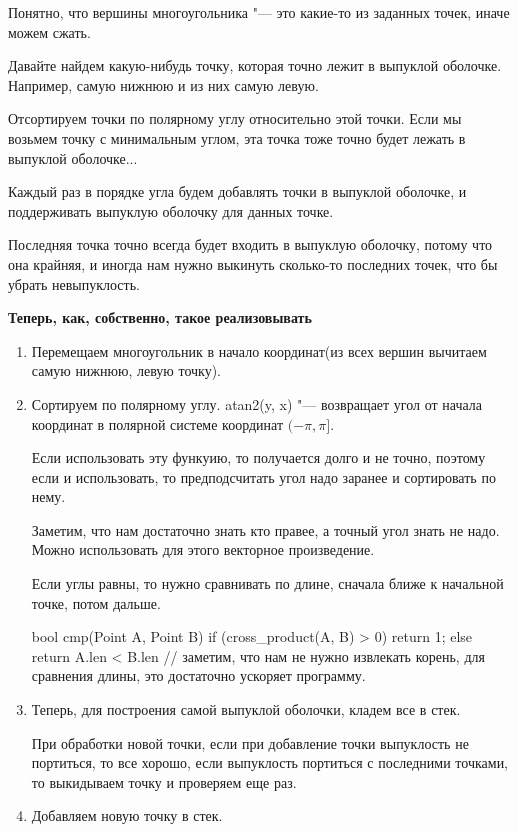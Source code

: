 Понятно, что вершины многоугольника "--- это какие-то из заданных точек, иначе можем сжать. 

Давайте найдем какую-нибудь точку, которая точно лежит в выпуклой оболочке. Например, самую нижнюю
и из них самую левую.

Отсортируем точки по полярному углу относительно этой точки. Если мы возьмем точку с минимальным углом, эта точка 
тоже точно будет лежать в выпуклой оболочке... 

Каждый раз в порядке угла будем добавлять точки в выпуклой оболочке, и поддерживать выпуклую оболочку для данных точке. 

Последняя точка точно всегда будет входить в выпуклую оболочку, потому что она крайняя, и иногда нам нужно выкинуть сколько-то
последних точек, что бы убрать невыпуклость.

\textbf{Теперь, как, собственно, такое реализовывать}

\begin{enumerate}
\item Перемещаем многоугольник в начало координат(из всех вершин вычитаем самую нижнюю, левую точку).

\item Сортируем по полярному углу.
atan2(y, x) "--- возвращает угол от начала координат в полярной системе координат $(-\pi, \pi]$.

Если использовать эту функуию, то получается долго и не точно, поэтому если и использовать, то предподсчитать угол надо
заранее и сортировать по нему.

Заметим, что нам достаточно знать кто правее,  а точный угол знать не надо. Можно использовать для этого векторное произведение.

Если углы равны, то нужно сравнивать по длине, сначала ближе к начальной точке, потом дальше.
\begin{cppcode}
bool cmp(Point A, Point B) {
    if (cross_product(A, B) > 0) return 1;
    else return A.len < B.len // заметим, что нам не нужно извлекать корень, для сравнения длины, это достаточно ускоряет программу. 
}
\end{cppcode}

\item
Теперь, для построения самой выпуклой оболочки, кладем все в стек.

При обработки новой точки, если при добавление точки выпуклость не портиться, то все хорошо,
если выпуклость портиться с последними точками, то выкидываем точку и проверяем еще раз.
\item
Добавляем новую точку в стек.  

\end{enumerate}
